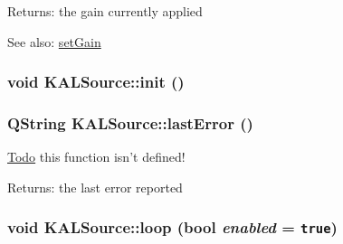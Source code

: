 \begin{Desc}
\item[Returns:]the gain currently applied \end{Desc}
\begin{Desc}
\item[See also:]\hyperlink{class_k_a_l_source_831dcd53e81bf704bf70974790298322}{setGain} \end{Desc}
\hypertarget{class_k_a_l_source_418bc777241fd144ffc392eff3fec919}{
\subsubsection[{init}]{\setlength{\rightskip}{0pt plus 5cm}void KALSource::init ()}}
\label{class_k_a_l_source_418bc777241fd144ffc392eff3fec919}


\hypertarget{class_k_a_l_source_e49f05979d560258949935990bb6540d}{
\subsubsection[{lastError}]{\setlength{\rightskip}{0pt plus 5cm}QString KALSource::lastError ()}}
\label{class_k_a_l_source_e49f05979d560258949935990bb6540d}


\begin{Desc}
\item[\hyperlink{todo__todo000001}{Todo}]this function isn't defined! \end{Desc}
\begin{Desc}
\item[Returns:]the last error reported \end{Desc}
\hypertarget{class_k_a_l_source_12ee746221eb1e6ab36fe8c30f0d14d4}{
\subsubsection[{loop}]{\setlength{\rightskip}{0pt plus 5cm}void KALSource::loop (bool {\em enabled} = {\tt true})}}
\label{class_k_a_l_source_12ee746221eb1e6ab36fe8c30f0d14d4}


